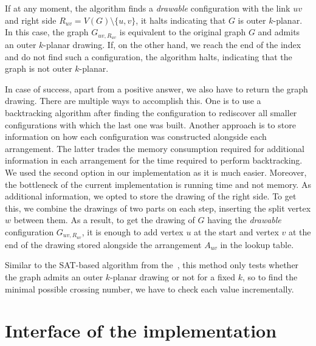 If at any moment, the algorithm finds a \emph{drawable} configuration with the link \(uv\) and right side \(R_{uv} = V(G)\setminus\{u, v\}\), it halts indicating that \(G\) is outer \(k\)-planar. In this case, the graph \(G_{uv, R_{uv}}\) is equivalent to the original graph \(G\) and admits an outer \(k\)-planar drawing. If, on the other hand, we reach the end of the index and do not find such a configuration, the algorithm halts, indicating that the graph is not outer \(k\)-planar.

In case of success, apart from a positive answer, we also have to return the graph drawing. There are multiple ways to accomplish this. One is to use a backtracking algorithm after finding the configuration to rediscover all smaller configurations with which the last one was built. Another approach is to store information on how each configuration was constructed alongside each arrangement. The latter trades the memory consumption required for additional information in each arrangement for the time required to perform backtracking. We used the second option in our implementation as it is much easier. Moreover, the bottleneck of the current implementation is running time and not memory. As additional information, we opted to store the drawing of the right side. To get this, we combine the drawings of two parts on each step, inserting the split vertex \(w\) between them. As a result, to get the drawing of \(G\) having the \emph{drawable} configuration \(G_{uv, R_{uv}}\), it is enough to add vertex \(u\) at the start and vertex \(v\) at the end of the drawing stored alongside the arrangement \(A_{uv}\) in the lookup table.

Similar to the SAT-based algorithm from the~, this method only tests whether the graph admits an outer \(k\)-planar drawing or not for a fixed \(k\), so to find the minimal possible crossing number, we have to check each value incrementally.


\section{Interface of the implementation}

